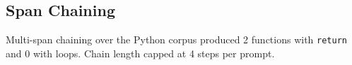 \subsection{Span Chaining}
Multi-span chaining over the Python corpus produced 2 functions with \texttt{return} and
0 with loops. Chain length capped at 4 steps per prompt.
